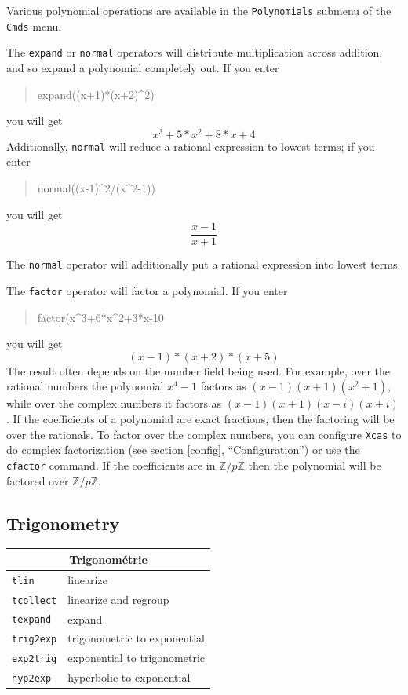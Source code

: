\documentclass{article}
\newcommand{\Z}{{\mathbb{Z}}}
\newcommand{\xcasin}[1]
{\begin{quote}\ttfamily
#1
\end{quote}}
\newcommand{\xcasout}[1]
{\begin{equation*}
#1
\end{equation*}}
\begin{document}
Various polynomial operations are available in the \texttt{Polynomials}
submenu of the \texttt{Cmds} menu.

The \texttt{expand} or \texttt{normal} operators will distribute
multiplication across addition, and so expand a polynomial completely
out.  If you enter
\xcasin{expand((x+1)*(x+2)\^{}2)}
you will get
\xcasout{x^3+5*x^2+8*x+4}
Additionally, \texttt{normal} will reduce a rational expression to
lowest terms; if you enter
\xcasin{normal((x-1)\^{}2/(x\^{}2-1))}
you will get
\xcasout{\frac{x-1}{x+1}}

The \texttt{normal} operator will additionally put a rational
expression into lowest terms.  

The \texttt{factor} operator will factor a polynomial.  
If you enter
\xcasin{factor(x\^{}3+6*x\^{}2+3*x-10}
you will get
\xcasout{(x-1)*(x+2)*(x+5)}
The result often depends on the number field being used.  For example, over the
rational numbers the polynomial $x^4 - 1$ factors as 
$(x-1)(x+1)(x^2 + 1)$, while over the complex numbers it factors as 
$(x-1)(x+1)(x-i)(x+i)$.  If the coefficients of a polynomial are exact
fractions, then the factoring will be over the rationals.  To factor
over the complex numbers, you can configure \texttt{Xcas} to do
complex factorization (see section \ref{config}, ``Configuration'')
or use the \texttt{cfactor} command.
If the coefficients are in $\Z/p\Z$ then the polynomial will be
factored over  $\Z/p\Z$.


\subsection{Trigonometry}

\begin{center}
\begin{tabular}{|p{}|p{}|}
\hline
\multicolumn{2}{|c|}{\bf Trigonom\'etrie}\\
\hline\hline
\texttt{tlin} &linearize\\
\texttt{tcollect} & linearize and regroup\\
\texttt{texpand} & expand\\
\texttt{trig2exp} & trigonometric to exponential\\
\texttt{exp2trig} &exponential to trigonometric\\
\texttt{hyp2exp} &hyperbolic to exponential\\
\hline
\end{tabular}
\end{center}
\end{document}
